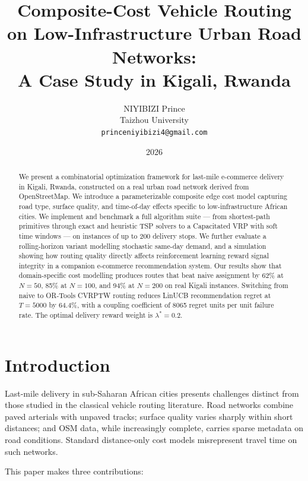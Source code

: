 \documentclass[12pt, a4paper]{article}
\title{Composite-Cost Vehicle Routing on Low-Infrastructure Urban Road Networks:\\
       A Case Study in Kigali, Rwanda}
\author{NIYIBIZI Prince\\
        \small Taizhou University\\
        \small \texttt{princeniyibizi4@gmail.com}}
\date{2026}
\begin{document}
\maketitle

\begin{abstract}
We present a combinatorial optimization framework for last-mile e-commerce
delivery in Kigali, Rwanda, constructed on a real urban road network derived
from OpenStreetMap. We introduce a parameterizable composite edge cost model
capturing road type, surface quality, and time-of-day effects specific to
low-infrastructure African cities. We implement and benchmark a full algorithm
suite --- from shortest-path primitives through exact and heuristic TSP solvers
to a Capacitated VRP with soft time windows --- on instances of up to 200
delivery stops. We further evaluate a rolling-horizon variant modelling
stochastic same-day demand, and a simulation showing how routing quality
directly affects reinforcement learning reward signal integrity in a companion
e-commerce recommendation system. Our results show that domain-specific cost
modelling produces routes that beat naive assignment by 62\% at $N=50$,
85\% at $N=100$, and 94\% at $N=200$ on real Kigali instances. Switching from
naive to OR-Tools CVRPTW routing reduces LinUCB recommendation regret at
$T=5000$ by 64.4\%, with a coupling coefficient of 8065 regret units per unit
failure rate. The optimal delivery reward weight is $\lambda^*=0.2$.
\end{abstract}

\section{Introduction}
\label{sec:intro}

Last-mile delivery in sub-Saharan African cities presents challenges distinct
from those studied in the classical vehicle routing literature. Road networks
combine paved arterials with unpaved tracks; surface quality varies sharply
within short distances; and OSM data, while increasingly complete, carries
sparse metadata on road conditions. Standard distance-only cost models
misrepresent travel time on such networks.

This paper makes three contributions:
\end{document}
